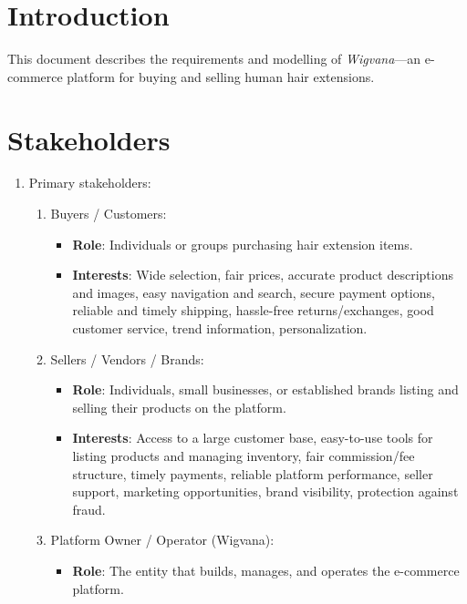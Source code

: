 \documentclass[a4paper,12pt]{article}
\begin{document}
\tableofcontents

\section{Introduction}

This document describes the requirements and modelling of \emph{Wigvana}---an e-commerce platform for buying and selling human hair extensions.

\section{Stakeholders}

\begin{enumerate}
    \item Primary stakeholders:
          \begin{enumerate}
              \item Buyers / Customers:
                    \begin{itemize}
                        \item \textbf{Role}: Individuals or groups purchasing hair extension items.
                        \item \textbf{Interests}: Wide selection, fair prices, accurate product descriptions and images, easy navigation and search, secure payment options, reliable and timely shipping, hassle-free returns/exchanges, good customer service, trend information, personalization.
                    \end{itemize}
              \item Sellers / Vendors / Brands:
                    \begin{itemize}
                        \item \textbf{Role}: Individuals, small businesses, or established brands listing and selling their products on the platform.
                        \item \textbf{Interests}: Access to a large customer base, easy-to-use tools for listing products and managing inventory, fair commission/fee structure, timely payments, reliable platform performance, seller support, marketing opportunities, brand visibility, protection against fraud.
                    \end{itemize}
              \item Platform Owner / Operator (Wigvana):
                    \begin{itemize}
                        \item \textbf{Role}: The entity that builds, manages, and operates the e-commerce platform.

\end{itemize}
\end{enumerate}
\end{enumerate}
\end{document}
